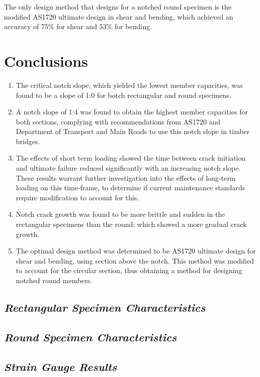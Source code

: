 \documentclass[11pt,a4paper]{article}
\numberwithin{equation}{subsection}
\begin{document}
\vspace*{\baselineskip}

\noindent
The only design method that designs for a notched round specimen is the modified AS1720 ultimate design in shear and bending, which achieved an accuracy of 75\% for shear and 53\% for bending.  

\pagebreak	

\section{Conclusions}

	\begin{enumerate}
		\item The critical notch slope, which yielded the lowest member capacities, was found to be a slope of 1:0 for botch rectangular and round specimens. 
		\item A notch slope of 1:4 was found to obtain the highest member capacities for both sections, complying with recommendations from AS1720 and Department of Transport and Main Roads to use this notch slope in timber bridges.
		\item The effects of short term loading showed the time between crack initiation and ultimate failure reduced significantly with an increasing notch slope. These results warrant further investigation into the effects of long-term loading on this time-frame, to determine if current maintenance standards require modification to account for this.
		\item Notch crack growth was found to be more brittle and sudden in the rectangular specimens than the round; which showed a more gradual crack growth.
		\item The optimal design method was determined to be AS1720 ultimate design for shear and bending, using section above the notch. This method was modified to account for the circular section, thus obtaining a method for designing notched round members. 
	\end{enumerate}

\pagebreak	




\pagebreak
\cleardoublepage
{}

\appendixtitleon

\begin{appendices}
	\section{\textit{Rectangular Specimen Characteristics}}
\pagebreak

\end{appendices}

\begin{appendices}
	\section{\textit{Round Specimen Characteristics}}
	\pagebreak
	
\end{appendices}

\begin{appendices}
	\section{\textit{Strain Gauge Results}}
	\pagebreak
	
\end{appendices}
\end{document}
